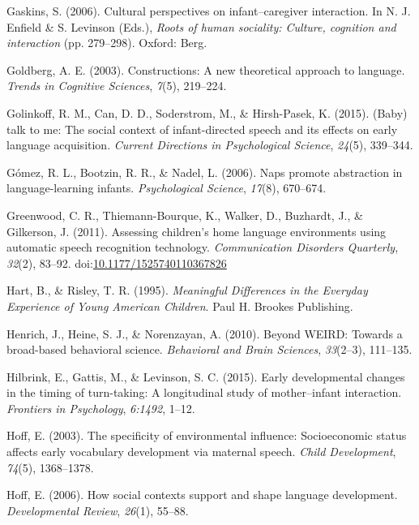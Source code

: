 \documentclass[floatsintext,man]{apa6}
\theoremstyle{definition}
\theoremstyle{definition}
\theoremstyle{definition}
\theoremstyle{remark}
\begin{document}
\hypertarget{ref-gaskins2006cultural}{}
Gaskins, S. (2006). Cultural perspectives on infant--caregiver
interaction. In N. J. Enfield \& S. Levinson (Eds.), \emph{Roots of
human sociality: Culture, cognition and interaction} (pp. 279--298).
Oxford: Berg.

\hypertarget{ref-goldberg2003constructions}{}
Goldberg, A. E. (2003). Constructions: A new theoretical approach to
language. \emph{Trends in Cognitive Sciences}, \emph{7}(5), 219--224.

\hypertarget{ref-golinkoff2015baby}{}
Golinkoff, R. M., Can, D. D., Soderstrom, M., \& Hirsh-Pasek, K. (2015).
(Baby) talk to me: The social context of infant-directed speech and its
effects on early language acquisition. \emph{Current Directions in
Psychological Science}, \emph{24}(5), 339--344.

\hypertarget{ref-gomez2006naps}{}
Gómez, R. L., Bootzin, R. R., \& Nadel, L. (2006). Naps promote
abstraction in language-learning infants. \emph{Psychological Science},
\emph{17}(8), 670--674.

\hypertarget{ref-greenwood2011assessing}{}
Greenwood, C. R., Thiemann-Bourque, K., Walker, D., Buzhardt, J., \&
Gilkerson, J. (2011). Assessing children's home language environments
using automatic speech recognition technology. \emph{Communication
Disorders Quarterly}, \emph{32}(2), 83--92.
doi:\href{https://doi.org/10.1177/1525740110367826}{10.1177/1525740110367826}

\hypertarget{ref-hart1995meaningful}{}
Hart, B., \& Risley, T. R. (1995). \emph{Meaningful Differences in the
Everyday Experience of Young American Children}. Paul H. Brookes
Publishing.

\hypertarget{ref-henrich2010beyond}{}
Henrich, J., Heine, S. J., \& Norenzayan, A. (2010). Beyond WEIRD:
Towards a broad-based behavioral science. \emph{Behavioral and Brain
Sciences}, \emph{33}(2--3), 111--135.

\hypertarget{ref-hilbrink2015early}{}
Hilbrink, E., Gattis, M., \& Levinson, S. C. (2015). Early developmental
changes in the timing of turn-taking: A longitudinal study of
mother--infant interaction. \emph{Frontiers in Psychology},
\emph{6:1492}, 1--12.

\hypertarget{ref-hoff2003specificity}{}
Hoff, E. (2003). The specificity of environmental influence:
Socioeconomic status affects early vocabulary development via maternal
speech. \emph{Child Development}, \emph{74}(5), 1368--1378.

\hypertarget{ref-hoff2006social}{}
Hoff, E. (2006). How social contexts support and shape language
development. \emph{Developmental Review}, \emph{26}(1), 55--88.
\end{document}
